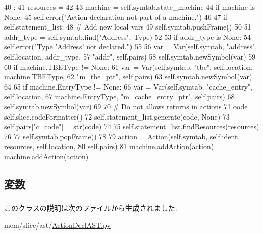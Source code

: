 \begin{DoxyCode}
40                       :
41         resources = {}
42 
43         machine = self.symtab.state_machine
44         if machine is None:
45             self.error("Action declaration not part of a machine.")
46 
47         if self.statement_list:
48             # Add new local vars
49             self.symtab.pushFrame()
50 
51             addr_type = self.symtab.find("Address", Type)
52 
53             if addr_type is None:
54                 self.error("Type 'Address' not declared.")
55 
56             var = Var(self.symtab, "address", self.location, addr_type,
57                       "addr", self.pairs)
58             self.symtab.newSymbol(var)
59 
60             if machine.TBEType != None:
61                 var = Var(self.symtab, "tbe", self.location, machine.TBEType,
62                       "m_tbe_ptr", self.pairs)
63                 self.symtab.newSymbol(var)
64 
65             if machine.EntryType != None:
66                 var = Var(self.symtab, "cache_entry", self.location,
67                           machine.EntryType, "m_cache_entry_ptr", self.pairs)
68                 self.symtab.newSymbol(var)
69 
70             # Do not allows returns in actions
71             code = self.slicc.codeFormatter()
72             self.statement_list.generate(code, None)
73             self.pairs["c_code"] = str(code)
74 
75             self.statement_list.findResources(resources)
76 
77             self.symtab.popFrame()
78 
79         action = Action(self.symtab, self.ident, resources, self.location,
80                         self.pairs)
81         machine.addAction(action)
        machine.addAction(action)
\end{DoxyCode}


\subsection{変数}
\hypertarget{classslicc_1_1ast_1_1ActionDeclAST_1_1ActionDeclAST_a2fe57e2d3d2cba9a3aeba2f629eaa78b}{
\subsubsection[{ident}]{}}
\label{classslicc_1_1ast_1_1ActionDeclAST_1_1ActionDeclAST_a2fe57e2d3d2cba9a3aeba2f629eaa78b}
\hypertarget{classslicc_1_1ast_1_1ActionDeclAST_1_1ActionDeclAST_a53a363e0fba452364cf9d6c768121237}{
\subsubsection[{statement\_\-list}]{}}
\label{classslicc_1_1ast_1_1ActionDeclAST_1_1ActionDeclAST_a53a363e0fba452364cf9d6c768121237}


このクラスの説明は次のファイルから生成されました:\begin{DoxyCompactItemize}
\item 
mem/slicc/ast/\hyperlink{ActionDeclAST_8py}{ActionDeclAST.py}\end{DoxyCompactItemize}
